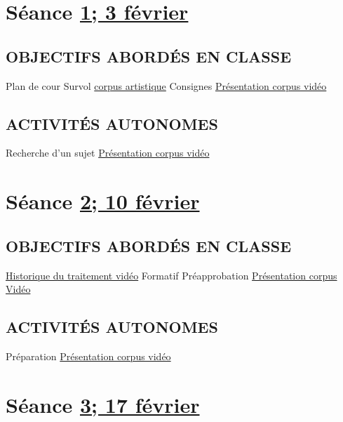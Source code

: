 \documentclass[
  french,
]{book}
\begin{document}
\hypertarget{semaine_1}{%
\section{\texorpdfstring{Séance \protect\hyperlink{semaine_1}{1; 3 février}}{Séance 1; 3 février}}\label{semaine_1}}

\hypertarget{objectifs-aborduxe9s-en-classe}{%
\subsection{OBJECTIFS ABORDÉS EN CLASSE}\label{objectifs-aborduxe9s-en-classe}}

Plan de cour
Survol \protect\hyperlink{corpus}{corpus artistique}
Consignes \protect\hyperlink{sommatif_1}{Présentation corpus vidéo}

\hypertarget{activituxe9s-autonomes}{%
\subsection{ACTIVITÉS AUTONOMES}\label{activituxe9s-autonomes}}

Recherche d'un sujet \protect\hyperlink{sommatif_1}{Présentation corpus vidéo}

\hypertarget{semaine_2}{%
\section{\texorpdfstring{Séance \protect\hyperlink{semaine_2}{2; 10 février}}{Séance 2; 10 février}}\label{semaine_2}}

\hypertarget{objectifs-aborduxe9s-en-classe-1}{%
\subsection{OBJECTIFS ABORDÉS EN CLASSE}\label{objectifs-aborduxe9s-en-classe-1}}

\protect\hyperlink{evolution_historique}{Historique du traitement vidéo}
Formatif Préapprobation \protect\hyperlink{sommatif_1}{Présentation corpus Vidéo}

\hypertarget{activituxe9s-autonomes-1}{%
\subsection{ACTIVITÉS AUTONOMES}\label{activituxe9s-autonomes-1}}

Préparation \protect\hyperlink{sommatif_1}{Présentation corpus vidéo}

\hypertarget{semaine_3}{%
\section{\texorpdfstring{Séance \protect\hyperlink{semaine_3}{3; 17 février}}{Séance 3; 17 février}}\label{semaine_3}}
\end{document}
